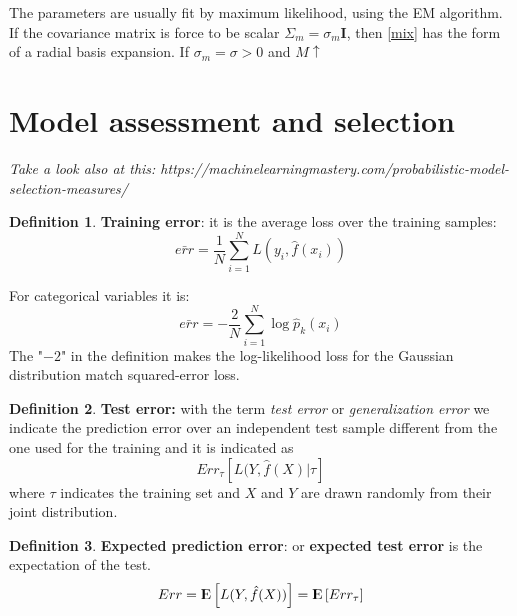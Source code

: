 \documentclass[12pt, letterpaper]{article}
\theoremstyle{definition}
\newtheorem{definition}{Definition}[section]
\newcommand{\E}{{\rm I\kern-.3em E}}
\newcommand{\I}{\mathrm{\mathbf{I}}}
\begin{document}
The parameters are usually fit by maximum likelihood, using the EM algorithm. If the covariance matrix is force to be scalar $\Sigma_m = \sigma_m \I$, then \ref{mix} has the form of a radial basis expansion. If $\sigma_m = \sigma >0$ and $M \uparrow $

\newpage
\section{Model assessment and selection}
\textit{Take a look also at this: https://machinelearningmastery.com/probabilistic-model-selection-measures/}
\begin{definition}{\textbf{Training error}}: it is the average loss over the training samples:
\begin{equation}
\bar{err} = \frac{1}{N}\sum_{i=1}^N L(y_i, \hat{f}(x_i))
\end{equation}

For categorical variables it is:
\begin{equation}
\bar{err}  = -\frac{2}{N} \sum_{i=1}^N \log\hat{p}_k(x_i)
\end{equation}
The "$-2$" in the definition makes the log-likelihood loss for the Gaussian distribution match squared-error loss.
\label{trainErr}
\end{definition}

\begin{definition}{\textbf{Test error:}} with  the term \textit{test error} or \textit{generalization error} we indicate the prediction error over an independent test sample different from the one used for the training and it is indicated as 
\begin{equation}
Err_\tau \left[L(Y,\hat{f}(X)|\tau\right]
\end{equation}
where $\tau$ indicates the training set and $X$ and $Y$ are drawn randomly from their joint distribution.
\end{definition}

\begin{definition}{\textbf{Expected prediction error}}: or \textbf{expected test error} is the expectation of the test.
\begin{equation}
Err = \E\left[ L(Y,\hat{f}(X))\right] =  \E\left[Err_\tau\right]
\end{equation}
\end{definition}
\end{document}
